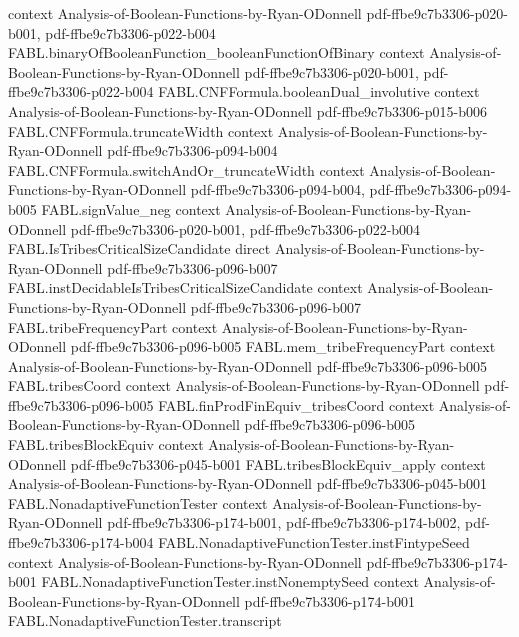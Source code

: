 \begin{theorem}
  {context}
  {Analysis-of-Boolean-Functions-by-Ryan-ODonnell}
  {pdf-ffbe9c7b3306-p020-b001,
    pdf-ffbe9c7b3306-p022-b004}
\proofstep
  {FABL.binaryOfBooleanFunction_booleanFunctionOfBinary}
  {context}
  {Analysis-of-Boolean-Functions-by-Ryan-ODonnell}
  {pdf-ffbe9c7b3306-p020-b001,
    pdf-ffbe9c7b3306-p022-b004}
\proofstep
  {FABL.CNFFormula.booleanDual_involutive}
  {context}
  {Analysis-of-Boolean-Functions-by-Ryan-ODonnell}
  {pdf-ffbe9c7b3306-p015-b006}
\proofstep
  {FABL.CNFFormula.truncateWidth}
  {context}
  {Analysis-of-Boolean-Functions-by-Ryan-ODonnell}
  {pdf-ffbe9c7b3306-p094-b004}
\proofstep
  {FABL.CNFFormula.switchAndOr_truncateWidth}
  {context}
  {Analysis-of-Boolean-Functions-by-Ryan-ODonnell}
  {pdf-ffbe9c7b3306-p094-b004,
    pdf-ffbe9c7b3306-p094-b005}
\proofstep
  {FABL.signValue_neg}
  {context}
  {Analysis-of-Boolean-Functions-by-Ryan-ODonnell}
  {pdf-ffbe9c7b3306-p020-b001,
    pdf-ffbe9c7b3306-p022-b004}
\proofstep
  {FABL.IsTribesCriticalSizeCandidate}
  {direct}
  {Analysis-of-Boolean-Functions-by-Ryan-ODonnell}
  {pdf-ffbe9c7b3306-p096-b007}
\proofstep
  {FABL.instDecidableIsTribesCriticalSizeCandidate}
  {context}
  {Analysis-of-Boolean-Functions-by-Ryan-ODonnell}
  {pdf-ffbe9c7b3306-p096-b007}
\proofstep
  {FABL.tribeFrequencyPart}
  {context}
  {Analysis-of-Boolean-Functions-by-Ryan-ODonnell}
  {pdf-ffbe9c7b3306-p096-b005}
\proofstep
  {FABL.mem_tribeFrequencyPart}
  {context}
  {Analysis-of-Boolean-Functions-by-Ryan-ODonnell}
  {pdf-ffbe9c7b3306-p096-b005}
\proofstep
  {FABL.tribesCoord}
  {context}
  {Analysis-of-Boolean-Functions-by-Ryan-ODonnell}
  {pdf-ffbe9c7b3306-p096-b005}
\proofstep
  {FABL.finProdFinEquiv_tribesCoord}
  {context}
  {Analysis-of-Boolean-Functions-by-Ryan-ODonnell}
  {pdf-ffbe9c7b3306-p096-b005}
\proofstep
  {FABL.tribesBlockEquiv}
  {context}
  {Analysis-of-Boolean-Functions-by-Ryan-ODonnell}
  {pdf-ffbe9c7b3306-p045-b001}
\proofstep
  {FABL.tribesBlockEquiv_apply}
  {context}
  {Analysis-of-Boolean-Functions-by-Ryan-ODonnell}
  {pdf-ffbe9c7b3306-p045-b001}
\proofstep
  {FABL.NonadaptiveFunctionTester}
  {context}
  {Analysis-of-Boolean-Functions-by-Ryan-ODonnell}
  {pdf-ffbe9c7b3306-p174-b001,
    pdf-ffbe9c7b3306-p174-b002,
    pdf-ffbe9c7b3306-p174-b004}
\proofstep
  {FABL.NonadaptiveFunctionTester.instFintypeSeed}
  {context}
  {Analysis-of-Boolean-Functions-by-Ryan-ODonnell}
  {pdf-ffbe9c7b3306-p174-b001}
\proofstep
  {FABL.NonadaptiveFunctionTester.instNonemptySeed}
  {context}
  {Analysis-of-Boolean-Functions-by-Ryan-ODonnell}
  {pdf-ffbe9c7b3306-p174-b001}
\proofstep
  {FABL.NonadaptiveFunctionTester.transcript}

\end{theorem}
